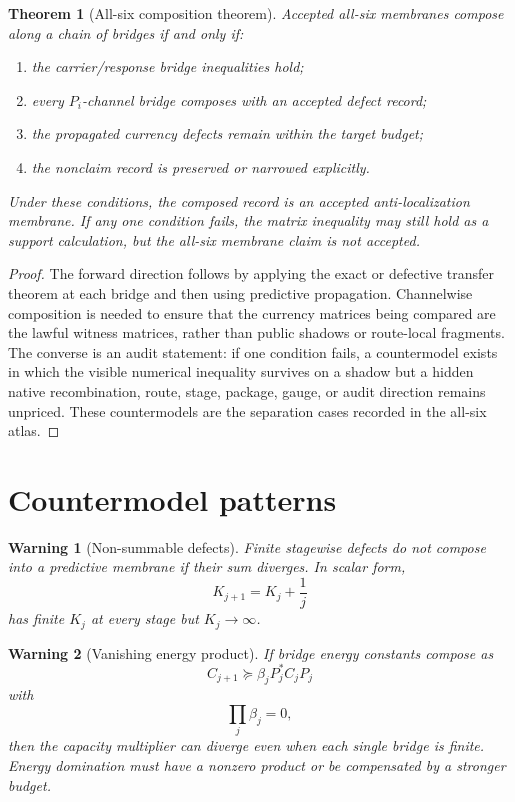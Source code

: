 \documentclass[11pt]{article}
\newtheorem{theorem}{Theorem}
\newtheorem{warning}{Warning}
\newcommand{\suc}{\succeq}
\begin{document}
\begin{theorem}[All-six composition theorem]
Accepted all-six membranes compose along a chain of bridges if and only if:
\begin{enumerate}
\item the carrier/response bridge inequalities hold;
\item every $P_i$-channel bridge composes with an accepted defect record;
\item the propagated currency defects remain within the target budget;
\item the nonclaim record is preserved or narrowed explicitly.
\end{enumerate}
Under these conditions, the composed record is an accepted anti-localization membrane.  If any one condition fails, the matrix inequality may still hold as a support calculation, but the all-six membrane claim is not accepted.
\end{theorem}

\begin{proof}
The forward direction follows by applying the exact or defective transfer theorem at each bridge and then using predictive propagation.  Channelwise composition is needed to ensure that the currency matrices being compared are the lawful witness matrices, rather than public shadows or route-local fragments.  The converse is an audit statement: if one condition fails, a countermodel exists in which the visible numerical inequality survives on a shadow but a hidden native recombination, route, stage, package, gauge, or audit direction remains unpriced.  These countermodels are the separation cases recorded in the all-six atlas.
\end{proof}

\section{Countermodel patterns}
\begin{warning}[Non-summable defects]
Finite stagewise defects do not compose into a predictive membrane if their sum diverges.  In scalar form,
\[
K_{j+1}=K_j+\frac1j
\]
has finite $K_j$ at every stage but $K_j\to\infty$.
\end{warning}

\begin{warning}[Vanishing energy product]
If bridge energy constants compose as
\[
C_{j+1}\suc \beta_j P_j^*C_jP_j
\]
with
\[
\prod_j\beta_j=0,
\]
then the capacity multiplier can diverge even when each single bridge is finite.  Energy domination must have a nonzero product or be compensated by a stronger budget.
\end{warning}
\end{document}
